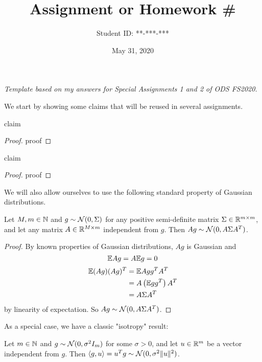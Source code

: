 \documentclass{article}
\title{Assignment or Homework \#}
\author{Student ID: **-***-***}
\date{May 31, 2020}
\numberwithin{equation}{subsection}
\begin{document}
\maketitle

\begin{center}
	\textit{Template based on my answers for Special Assignments 1 and 2 of ODS FS2020.}
\end{center}

We start by showing some claims that will be reused in several assignments.

\begin{claim} \label{claim:dummy_claim}
	claim
\end{claim}

\begin{proof}
	proof
\end{proof}

\begin{claim} 
	claim
\end{claim}

\begin{proof}
	proof
\end{proof}

We will also allow ourselves to use the following standard property of Gaussian distributions.
\begin{fact}
	Let $M, m \in \mathbb{N}$ and $g \sim \mathcal{N}(0, \Sigma)$ for any positive semi-definite matrix $\Sigma \in \mathbb{R}^{m \times m}$, and let any matrix $A \in \mathbb{R}^{M \times m}$ independent from $g$.
	Then $A g \sim \mathcal{N}(0, A \Sigma A^T)$.
\end{fact}

\begin{proof}
    By known properties of Gaussian distributions, $A g$ is Gaussian and
    \begin{equation}
        \mathbb{E} A g = A \mathbb{E} g = 0
    \end{equation}
    \begin{align}
        \mathbb{E} (A g) (A g)^T &= \mathbb{E} A g g^T A^T \\
        &= A \left( \mathbb{E} g g^T \right) A^T \\
        &= A \Sigma A^T
    \end{align}
    by linearity of expectation. So $A g \sim \mathcal{N}(0, A \Sigma A^T)$.
\end{proof}

As a special case, we have a classic "isotropy" result:
\begin{fact}
	Let $m \in \mathbb{N}$ and $g \sim \mathcal{N}(0, \sigma^2 I_m)$ for some $\sigma > 0$, and let $u \in \mathbb{R}^m$ be a vector independent from $g$. Then $\langle g, u \rangle = u^T g \sim \mathcal{N}(0, \sigma^2 \|u\|^2)$.
\end{fact}
\end{document}
